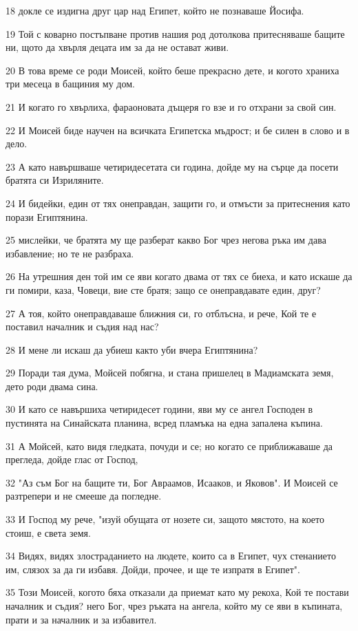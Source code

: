 \par 18 докле се издигна друг цар над Египет, който не познаваше Йосифа.
\par 19 Той с коварно постъпване против нашия род дотолкова притесняваше бащите ни, щото да хвърля децата им за да не остават живи.
\par 20 В това време се роди Моисей, който беше прекрасно дете, и когото храниха три месеца в бащиния му дом.
\par 21 И когато го хвърлиха, фараоновата дъщеря го взе и го отхрани за свой син.
\par 22 И Моисей биде научен на всичката Египетска мъдрост; и бе силен в слово и в дело.
\par 23 А като навършваше четиридесетата си година, дойде му на сърце да посети братята си Изриляните.
\par 24 И бидейки, един от тях онеправдан, защити го, и отмъсти за притеснения като порази Египтянина.
\par 25 мислейки, че братята му ще разберат какво Бог чрез негова ръка им дава избавление; но те не разбраха.
\par 26 На утрешния ден той им се яви когато двама от тях се биеха, и като искаше да ги помири, каза, Човеци, вие сте братя; защо се онеправдавате един, друг?
\par 27 А тоя, който онеправдаваше ближния си, го отблъсна, и рече, Кой те е поставил началник и съдия над нас?
\par 28 И мене ли искаш да убиеш както уби вчера Египтянина?
\par 29 Поради тая дума, Мойсей побягна, и стана пришелец в Мадиамската земя, дето роди двама сина.
\par 30 И като се навършиха четиридесет години, яви му се ангел Господен в пустинята на Синайската планина, всред пламъка на една запалена къпина.
\par 31 А Мойсей, като видя гледката, почуди и се; но когато се приближаваше да прегледа, дойде глас от Господ,
\par 32 "Аз съм Бог на бащите ти, Бог Авраамов, Исааков, и Яковов". И Моисей се разтрепери и не смееше да погледне.
\par 33 И Господ му рече, "изуй обущата от нозете си, защото мястото, на което стоиш, е света земя.
\par 34 Видях, видях злостраданието на людете, които са в Египет, чух стенанието им, слязох за да ги избавя. Дойди, прочее, и ще те изпратя в Египет".
\par 35 Този Моисей, когото бяха отказали да приемат като му рекоха, Кой те постави началник и съдия? него Бог, чрез ръката на ангела, който му се яви в къпината, прати и за началник и за избавител.
